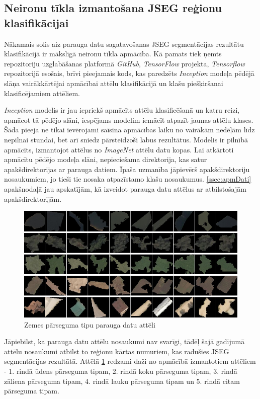 \documentclass[12pt,paper=a4]{report}
\begin{document}
\subsection{Neironu tīkla izmantošana JSEG reģionu klasifikācijai}
Nākamais solis aiz parauga datu sagatavošanas JSEG segmentācijas rezultātu klasifikācijā ir mākslīgā neironu tīkla apmācība. Kā pamats tiek ņemts repozitoriju uzglabāšanas platformā \textit{GitHub}, \textit{TensorFlow} projekta, \textit{Tensorflow} repozitorijā esošais, brīvi pieejamais kods, kas paredzēts \textit{Inception} modeļa pēdējā slāņa vairākkārtējai apmācībai attēlu klasifikācijā un klašu piešķiršanai klasificējamiem attēliem.\par
\textit{Inception} modelis ir jau iepriekš apmācīts attēlu klasificēšanā un katru reizi, apmācot tā pēdējo slāni, iespējams modelim iemācīt atpazīt jaunas attēlu klases. Šāda pieeja ne tikai ievērojami saīsina apmācības laiku no vairākām nedēļām līdz nepilnai stundai, bet arī sniedz pārsteidzoši labus rezultātus. Modelis ir pilnībā apmācīts, izmantojot attēlus no \textit{ImageNet} attēlu datu kopas. Lai atkārtoti apmācītu pēdējo modeļa slāni, nepieciešama direktorija, kas satur apakšdirektorijas ar parauga datiem. Īpaša uzmanība jāpievērš apakšdirektoriju nosaukumiem, jo tieši tie nosaka atpazīstamo klašu nosaukumus. \ref{ssec:apmDati} apakšnodaļā jau apskatījām, kā izveidot parauga datu attēlus ar atbilstošajām apakšdirektorijām.
\begin{figure}[h!]
\centering
\includegraphics[width=\linewidth]{paraugaDatiTF}
\caption{Zemes pārseguma tipu parauga datu attēli}
\label{fig:paraugaDati}
\end{figure}
Jāpiebilst, ka parauga datu attēlu nosaukumi nav svarīgi, tādēļ šajā gadījumā attēlu nosaukumi atbilst to reģionu kārtas numuriem, kas radušies JSEG segmentācijas rezultātā. Attēlā \ref{fig:paraugaDati} redzami daži no apmācībā izmantotiem attēliem - 1. rindā ūdens pārseguma tipam, 2. rindā koku pārseguma tipam, 3. rindā zāliena pārseguma tipam, 4. rindā lauku pārseguma tipam un 5. rindā citam pārseguma tipam.\par
\end{document}

